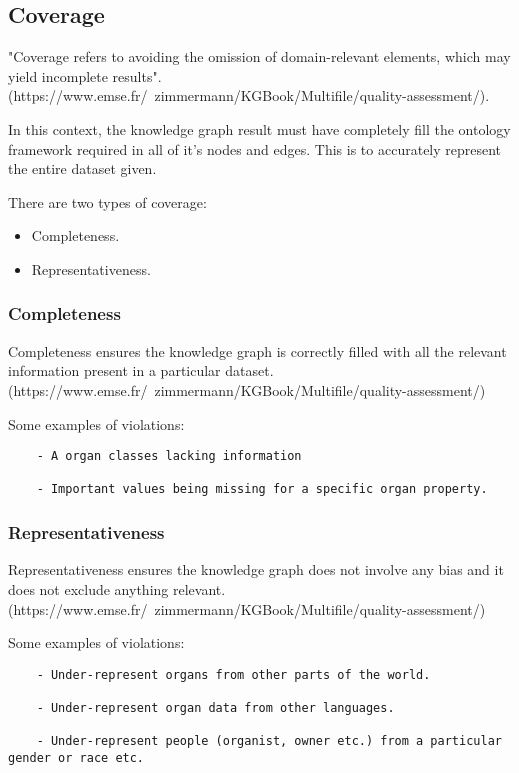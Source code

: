 \subsection{Coverage}
\hspace{0.5cm} "Coverage refers to avoiding the omission of domain-relevant elements, which may yield incomplete results". \\ (https://www.emse.fr/~zimmermann/KGBook/Multifile/quality-assessment/). 

In this context, the knowledge graph result must have completely fill the ontology framework required in all of it's nodes and edges. This is to accurately represent the entire dataset given. 

There are two types of coverage: 
\begin{itemize}
\item Completeness.
\item Representativeness.
\end{itemize}

\subsubsection{Completeness}
\hspace{0.5cm} Completeness ensures the knowledge graph is correctly filled with all the relevant information present in a particular dataset. \\(https://www.emse.fr/~zimmermann/KGBook/Multifile/quality-assessment/)

Some examples of violations: 
\begin{lstlisting}
    - A organ classes lacking information

    - Important values being missing for a specific organ property. 
\end{lstlisting}

\subsubsection{Representativeness}
\hspace{0.5cm} Representativeness ensures the knowledge graph does not involve any bias and it does not exclude anything relevant. \\
(https://www.emse.fr/~zimmermann/KGBook/Multifile/quality-assessment/) 

Some examples of violations: 
\begin{lstlisting}
    - Under-represent organs from other parts of the world.
    
    - Under-represent organ data from other languages.

    - Under-represent people (organist, owner etc.) from a particular gender or race etc.
\end{lstlisting}

